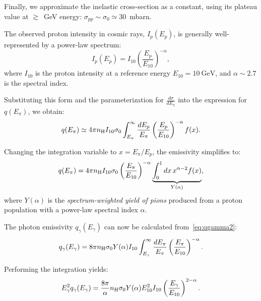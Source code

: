 Finally, we approximate the inelastic cross-section as a constant, using its plateau value at \( \gtrsim \)~GeV energy: \( \sigma_{pp} \sim \sigma_0 \simeq 30 \)~mbarn.


The observed proton intensity in cosmic rays, \(I_p(E_p)\), is generally well-represented by a power-law spectrum:
\begin{equation}
I_p(E_p) = I_{10} \left(\frac{E_p}{E_{10}}\right)^{-\alpha},
\end{equation}
where \(I_{10}\) is the proton intensity at a reference energy \(E_{10} = 10~\text{GeV}\), and \(\alpha \sim 2.7\) is the spectral index.  

Substituting this form and the parameterization for \(\frac{d\sigma}{dE_\pi}\) into the expression for \(q(E_\pi)\), we obtain:
\begin{equation}
q(E_\pi) \simeq 4 \pi n_{\rm H} I_{10} \sigma_0 \int_{E_\pi}^\infty \frac{dE_p}{E_\pi} \left(\frac{E_p}{E_{10}} \right)^{-\alpha} f(x).
\end{equation}

Changing the integration variable to \(x = E_\pi / E_p\), the emissivity simplifies to:
\begin{equation}
q(E_\pi) = 4 \pi n_{\rm H} I_{10} \sigma_0 \left(\frac{E_\pi}{E_{10}} \right)^{-\alpha} \underbrace{\int_0^1 dx \, x^{\alpha-2} f(x)}_{Y(\alpha)},
\end{equation}
where \(Y(\alpha)\) is the \emph{spectrum-weighted yield of pions} produced from a proton population with a power-law spectral index \(\alpha\).  

The photon emissivity \(q_\gamma(E_\gamma)\) can now be calculated from~\cref{eq:qgamma2}:  
\begin{equation}
q_\gamma(E_\gamma) = 8 \pi n_{\rm H} \sigma_0 Y(\alpha) I_{10} \int_{E_\gamma}^\infty \frac{dE_\pi}{E_\pi} \left(\frac{E_\pi}{E_{10}}\right)^{-\alpha}.
\end{equation}

Performing the integration yields:
\begin{equation}
E_\gamma^2 q_\gamma(E_\gamma) = \frac{8 \pi}{\alpha} n_{\rm H} \sigma_0 Y(\alpha) E_{10}^2 I_{10} \left(\frac{E_\gamma}{E_{10}}\right)^{2-\alpha}.
\end{equation}

